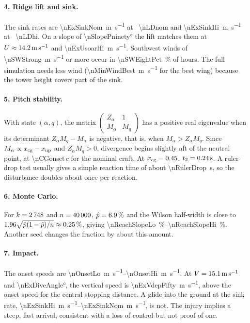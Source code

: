 \paragraph{4. Ridge lift and sink.}
The sink rates are \SI{\nExSinkNom}{\meter\per\second} at \LD~\num{\nLDnom} and
\SI{\nExSinkHi}{\meter\per\second} at \LD~\num{\nLDhi}.
On a slope of \ang{\nSlopePninety} the lift matches them at \(U \approx
\SI{14.2}{\meter\per\second}\) and \SI{\nExUsoarHi}{\meter\per\second}.
Southwest winds of \SI{\nSWStrong}{\meter\per\second} or more occur in \SI{\nSWEightPct}{\percent} of
hours.
The full simulation needs less wind (\SI{\nMinWindBest}{\meter\per\second} for the best wing)
because the tower height covers part of the sink.

\paragraph{5. Pitch stability.}
With state \((\alpha, q)\), the matrix \(\begin{pmatrix} Z_\alpha & 1 \\ M_\alpha & M_q
\end{pmatrix}\) has a positive real eigenvalue when its determinant \(Z_\alpha M_q -
M_\alpha\) is negative, that is, when \(M_\alpha > Z_\alpha M_q\).
Since \(M_\alpha \propto x_\mathrm{cg} - x_\mathrm{np}\) and \(Z_\alpha M_q > 0\), divergence begins
slightly aft of the neutral point, at \num{\nCGonset}\,\(c\) for the nominal craft.
At \(x_\mathrm{cg} = 0.45\), \(t_2 = \SI{0.24}{\second}\).
A ruler-drop test usually gives a simple reaction time of about \SI{\nRulerDrop}{\second}, so the
disturbance doubles about once per reaction.

\paragraph{6. Monte Carlo.}
For \(k = 2\,748\) and \(n = 40\,000\), \(\hat p = \SI{6.9}{\percent}\) and
the Wilson half-width is close to \(1.96\sqrt{\hat p(1-\hat p)/n} \approx
\SI{0.25}{\percent}\), giving \SIrange{\nReachSlopeLo}{\nReachSlopeHi}{\percent}.
Another seed changes the fraction by about this amount.

\paragraph{7. Impact.}
The onset speeds are \SIrange{\nOnsetLo}{\nOnsetHi}{\meter\per\second}.
At \(V = \SI{15.1}{\meter\per\second}\) and \ang{\nExDiveAngle}, the vertical speed is
\SI{\nExVdepFifty}{\meter\per\second}, above the onset speed for the central stopping
distance.
A glide into the ground at the sink rate, \SIrange{\nExSinkHi}{\nExSinkNom}{\meter\per\second},
is not.
The injury implies a steep, fast arrival, consistent with a loss of control but not proof
of one.
